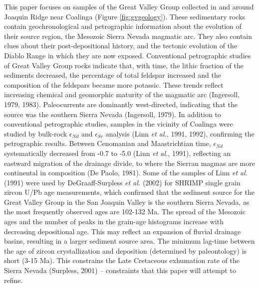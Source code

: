 \documentclass[11pt,twoside]{article}
\begin{document}
This paper focuses  on samples of the Great  Valley Group collected in
and around  Joaquin Ridge near  Coalinga (Figure \ref{fig:gvgeology}).
These  sedimentary  rocks  contain geochronological  and  petrographic
information about  the evolution of their source  region, the Mesozoic
Sierra  Nevada magmatic  arc.   They also  contain  clues about  their
post-depositional history,  and the  tectonic evolution of  the Diablo
Range  in  which  they  are now  exposed.   Conventional  petrographic
studies  of Great  Valley Group  rocks indicate  that, with  time, the
lithic fraction  of the sediments  decreased, the percentage  of total
feldspar increased  and the composition  of the feldspars  became more
potassic.   These trends  reflect increasing  chemical  and geomorphic
maturity of  the magmatic arc (Ingersoll,  1979, 1983).  Paleocurrents
are  dominantly  west-directed, indicating  that  the  source was  the
southern Sierra Nevada (Ingersoll, 1979).  In addition to conventional
petrographic studies, samples in the vicinity of Coalinga were studied
by bulk-rock  $\epsilon_{Nd}$ and $\epsilon_{Sr}$  analysis (Linn {\it
et al.},  1991, 1992),  confirming the petrographic  results.  Between
Cenomanian  and  Maastrichtian  time,  $\epsilon_{Nd}$  systematically
decreased from -0.7  to -5.0 (Linn {\it et  al.}, 1991), reflecting an
eastward migration of the drainage divide, to where the Sierran magmas
are more  continental in  composition (De Paolo,  1981).  Some  of the
samples of  Linn {\it et  al.}  (1991) were used  by DeGraaff-Surpless
{\it  et  al.}   (2002)  for  SHRIMP  single  grain  zircon  U/Pb  age
measurements, which  confirmed that the sediment source  for the Great
Valley Group in the San  Joaquin Valley is the southern Sierra Nevada,
as the  most frequently observed ages  are 102-132 Ma.   The spread of
the Mesozoic ages and the  number of peaks in the grain-age histograms
increase  with  decreasing  depositional  age.  This  may  reflect  an
expansion of  fluvial drainage basins, resulting in  a larger sediment
source  area.   The  minimum   lag-time  between  the  age  of  zircon
crystallization and  deposition (determined by  paleontology) is short
(3-15 Ma).  This constrains the Late Cretaceous exhumation rate of the
Sierra  Nevada (Surpless, 2001)  -- constraints  that this  paper will
attempt to refine.  \\
\end{document}
